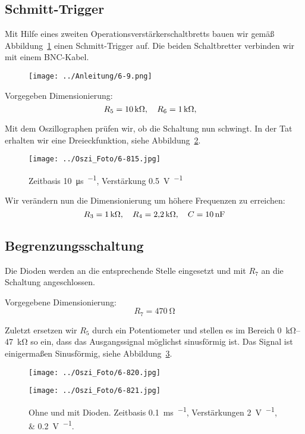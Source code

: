 \FloatBarrier
\subsection{Schmitt-Trigger}

Mit Hilfe eines zweiten Operationsverstärkerschaltbretts bauen wir gemäß
Abbildung~\ref{fig:6-9} einen Schmitt-Trigger auf. Die beiden Schaltbretter
verbinden wir mit einem BNC-Kabel.

\begin{figure}[htbp]
	\centering
	\texttt{[image: ../Anleitung/6-9.png]}
	\caption{%
		\cite[Abbildung~6.9]{physik313-Anleitung}
	}
	\label{fig:6-9}
\end{figure}

Vorgegeben Dimensionierung:
\[
	R_5 = \SI{10}{\kilo\ohm} ,\quad
	R_6 = \SI{1}{\kilo\ohm} ,\quad
\]

Mit dem Oszillographen prüfen wir, ob die Schaltung nun schwingt. In der Tat
erhalten wir eine Dreieckfunktion, siehe Abbildung~\ref{fig:815}.

\begin{figure}[htbp]
	\centering
	\texttt{[image: ../Oszi\_Foto/6-815.jpg]}
	\caption{%
		Zeitbasis \SI{10}{\micro\second\per\division},
		Verstärkung \SI{.5}{\volt\per\division}
	}
	\label{fig:815}
\end{figure}

Wir verändern nun die Dimensionierung um höhere Frequenzen zu erreichen:
\[
	R_3 = \SI{1}{\kilo\ohm} ,\quad
	R_4 = \SI{2.2}{\kilo\ohm} ,\quad
	C = \SI{10}{\nano\farad}
\]

\FloatBarrier
\subsection{Begrenzungsschaltung}

Die Dioden werden an die entsprechende Stelle eingesetzt und mit $R_7$ an die
Schaltung angeschlossen.

Vorgegebene Dimensionierung:
\[
	R_7 = \SI{470}\ohm
\]

Zuletzt ersetzen wir $R_5$ durch ein Potentiometer und stellen es im Bereich
\SIrange{0}{47}{\kilo\ohm} so ein, dass das Ausgangssignal möglichst
sinusförmig ist. Das Signal ist einigermaßen Sinusförmig, siehe
Abbildung~\ref{fig:820}.

\begin{figure}[htbp]
	\centering
	\begin{minipage}{.45\linewidth}
		\texttt{[image: ../Oszi\_Foto/6-820.jpg]}
	\end{minipage}
	\hfill
	\begin{minipage}{.45\linewidth}
		\texttt{[image: ../Oszi\_Foto/6-821.jpg]}
	\end{minipage}
	\caption{%
		Ohne und mit Dioden.
		Zeitbasis \SI{.1}{\milli\second\per\division},
		Verstärkungen \SIlist{2;.2}{\volt\per\division}.
	}
	\label{fig:820}
\end{figure}

